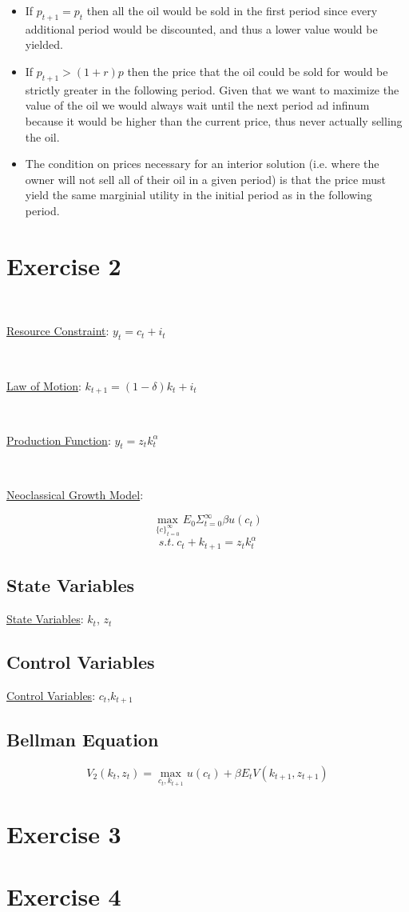 \documentclass{article}
\begin{document}
\begin{itemize}

\item If $p_{t+1} = p_t$ then all the oil would be sold in the first period since every additional period would be discounted, and thus a lower value would be yielded.

\item If $p_{t+1}>(1+ r)p$ then the price that the oil could be sold for would be strictly greater in the following period. Given that we want to maximize the value of the oil we would always wait until the next period ad infinum because it would be higher than the current price, thus never actually selling the oil.

\item The condition on prices necessary for an interior solution (i.e. where the owner will not sell all of their oil in a given period) is that the price must yield the same marginial utility in the initial period as in the following period.

\end{itemize}

\section{Exercise 2}

\

\underline{Resource Constraint}: $y_t = c_t + i_t$

\

\underline{Law of Motion}: $k_{t+1} = (1-\delta)k_t + i_t$

\

\underline{Production Function}: $y_t = z_tk_t^\alpha$

\

\underline{Neoclassical Growth Model}:

\[ \max_{\{c\}_{t=0}^\infty} E_0 \Sigma_{t=0}^\infty \beta u(c_t)\]
\[ s.t. \ c_t + k_{t+1} = z_tk_t^\alpha\]


\subsection{State Variables}

\underline{State Variables}: $k_t$, $z_t$

\subsection{Control Variables}

\underline{Control Variables}: $c_t$,$k_{t+1}$

\subsection{Bellman Equation}

\[ V_2(k_t, z_t) = \max_{c_t, k_{t+1}} u(c_t) + \beta E_tV(k_{t+1},z_{t+1}) \]

\section{Exercise 3}


\section{Exercise 4}
\end{document}

